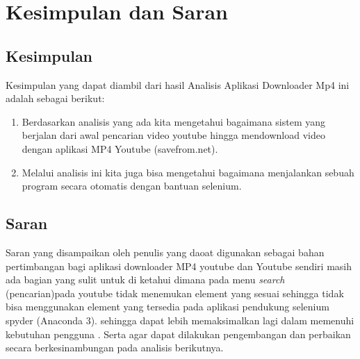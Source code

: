 \chapter{Kesimpulan dan Saran}

\section{Kesimpulan}
Kesimpulan yang dapat diambil dari hasil Analisis Aplikasi Downloader Mp4 ini adalah sebagai berikut:
\begin{enumerate}
    \item Berdasarkan analisis yang ada  kita mengetahui bagaimana sistem yang berjalan dari awal pencarian video youtube hingga mendownload video dengan aplikasi MP4 Youtube (savefrom.net).
    \item Melalui analisis ini kita juga bisa mengetahui bagaimana menjalankan sebuah program secara otomatis dengan bantuan selenium.
\end{enumerate}
\section{Saran}
Saran yang disampaikan oleh penulis yang daoat digunakan sebagai bahan pertimbangan bagi aplikasi downloader MP4 youtube dan Youtube sendiri masih ada bagian yang sulit untuk di  ketahui dimana pada menu \textit {search} {(pencarian)}pada youtube tidak menemukan element yang sesuai sehingga tidak bisa menggunakan element yang tersedia pada aplikasi pendukung selenium spyder {(Anaconda 3)}. sehingga dapat lebih memaksimalkan lagi dalam memenuhi kebutuhan pengguna . Serta agar dapat dilakukan pengembangan dan perbaikan secara berkesinambungan pada analisis berikutnya.